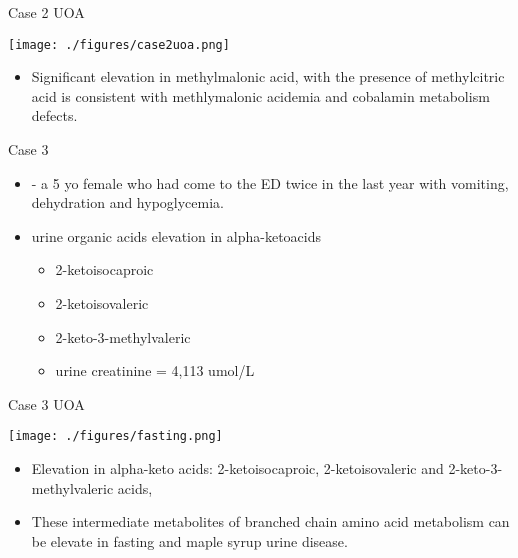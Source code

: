 \documentclass[presentation, smaller]{beamer}
\begin{document}
\begin{frame}[label={sec:orgab9df0c}]{Case 2 UOA}
\begin{center}
\texttt{[image: ./figures/case2uoa.png]}
\end{center}

\pause

\begin{itemize}
\item Significant elevation in methylmalonic acid, with the presence of
methylcitric acid is consistent with methlymalonic acidemia
and cobalamin metabolism defects.
\end{itemize}
\end{frame}

\begin{frame}[label={sec:orgd159ba7}]{Case 3}
\begin{itemize}
\item - a 5 yo female who had come to the ED twice in the last year with
vomiting, dehydration and hypoglycemia.

\item urine organic acids elevation in alpha-ketoacids 
\begin{itemize}
\item 2-ketoisocaproic
\item 2-ketoisovaleric
\item 2-keto-3-methylvaleric
\item urine creatinine = 4,113 umol/L
\end{itemize}
\end{itemize}
\end{frame}


\begin{frame}[label={sec:org33bde1f}]{Case 3 UOA}
\begin{center}
\texttt{[image: ./figures/fasting.png]}
\end{center}

\pause

\begin{itemize}
\item Elevation in alpha-keto acids: 2-ketoisocaproic, 2-ketoisovaleric
and 2-keto-3-methylvaleric acids,
\item These intermediate metabolites of branched chain amino acid
metabolism can be elevate in fasting and maple syrup urine
disease.
\end{itemize}
\end{frame}
\end{document}
